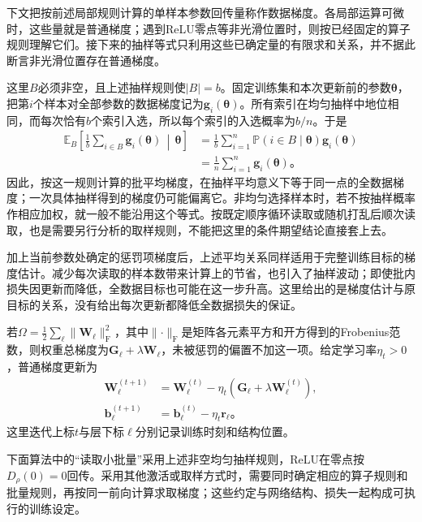 下文把按前述局部规则计算的单样本参数回传量称作数据梯度。各局部运算可微时，这些量就是普通梯度；遇到ReLU零点等非光滑位置时，则按已经固定的算子规则理解它们。接下来的抽样等式只利用这些已确定量的有限求和关系，并不据此断言非光滑位置存在普通梯度。

这里$B$必须非空，且上述抽样规则使$|B|=b$。固定训练集和本次更新前的参数$\bm\theta$，把第$i$个样本对全部参数的数据梯度记为$\bm g_i(\bm\theta)$。所有索引在均匀抽样中地位相同，而每次恰有$b$个索引入选，所以每个索引的入选概率为$b/n$。于是
\[
  \begin{aligned}
    \mathbb{E}_B\!\left[
      \frac1b\sum_{i\in B}\bm g_i(\bm\theta)
      \,\middle|\,\bm\theta\right]
      &=\frac1b\sum_{i=1}^{n}
        \mathbb{P}(i\in B\mid\bm\theta)\bm g_i(\bm\theta)\\
      &=\frac1n\sum_{i=1}^{n}\bm g_i(\bm\theta)\text{。}
  \end{aligned}
\]
因此，按这一规则计算的批平均梯度，在抽样平均意义下等于同一点的全数据梯度；一次具体抽样得到的梯度仍可能偏离它。非均匀选择样本时，若不按抽样概率作相应加权，就一般不能沿用这个等式。按既定顺序循环读取或随机打乱后顺次读取，也是需要另行分析的取样规则，不能把这里的条件期望结论直接套上去。

加上当前参数处确定的惩罚项梯度后，上述平均关系同样适用于完整训练目标的梯度估计。减少每次读取的样本数带来计算上的节省，也引入了抽样波动；即使批内损失因更新而降低，全数据目标也可能在这一步升高。这里给出的是梯度估计与原目标的关系，没有给出每次更新都降低全数据损失的保证。

若$\Omega=\frac12\sum_\ell\lVert\bm{W}_\ell\rVert_{\mathrm{F}}^2$，其中$\lVert\cdot\rVert_{\mathrm{F}}$是矩阵各元素平方和开方得到的Frobenius范数，则权重总梯度为$\bm{G}_\ell+\lambda\bm{W}_\ell$，未被惩罚的偏置不加这一项。给定学习率$\eta_t>0$，普通梯度更新为
\begin{equation}
  \begin{aligned}
    \bm{W}_\ell^{(t+1)}
      &=\bm{W}_\ell^{(t)}-\eta_t(\bm{G}_\ell+\lambda\bm{W}_\ell^{(t)}),\\
    \bm{b}_\ell^{(t+1)}&=\bm{b}_\ell^{(t)}-\eta_t\bm{r}_\ell\text{。}
  \end{aligned}
  \label{eq:ffn-gradient-update}
\end{equation}
这里迭代上标$t$与层下标$\ell$分别记录训练时刻和结构位置。

下面算法中的“读取小批量”采用上述非空均匀抽样规则，ReLU在零点按$D_\rho(0)=0$回传。采用其他激活或取样方式时，需要同时确定相应的算子规则和批量规则，再按同一前向计算求取梯度；这些约定与网络结构、损失一起构成可执行的训练设定。

